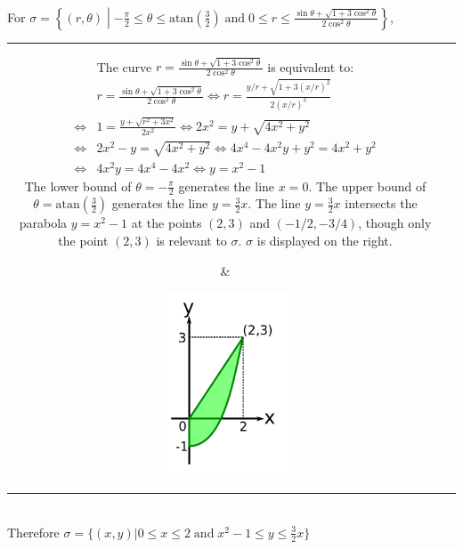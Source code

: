 \documentclass{article}
\newcommand{\atan}{\text{atan}}
\newcommand{\dr}[1]{\textcolor{dark_red}{#1}}
\begin{document}
\dr{\begin{framed}
For \(\sigma = \left\{(r,\theta) \middle| -\frac{\pi}{2} \leq \theta \leq \atan(\frac{3}{2}) \;\text{and}\; 0 \leq r \leq \frac{\sin\theta + \sqrt{1 + 3\cos^2\theta}}{2\cos^2\theta}\right\}\), \\
\begin{tabular}{cc}
\parbox{0.6\textwidth}{
The curve \(r = \frac{\sin\theta + \sqrt{1 + 3\cos^2\theta}}{2\cos^2\theta}\) is equivalent to: 
\begin{align*}
& r = \frac{\sin\theta + \sqrt{1 + 3\cos^2\theta}}{2\cos^2\theta} 
\iff r = \frac{y/r + \sqrt{1 + 3(x/r)^2}}{2(x/r)^2} \\
\iff & 1 = \frac{y + \sqrt{r^2 + 3x^2}}{2x^2} 
\iff 2x^2 = y + \sqrt{4x^2 + y^2} \\
\iff & 2x^2 - y = \sqrt{4x^2 + y^2} 
\iff 4x^4 - 4x^2y + y^2 = 4x^2 + y^2 \\
\iff & 4x^2y = 4x^4 - 4x^2 
\iff y = x^2 - 1
\end{align*}
The lower bound of \(\theta = -\frac{\pi}{2}\) generates the line \(x = 0\). The upper bound of \(\theta = \atan(\frac{3}{2})\) generates the line \(y = \frac{3}{2}x\). The line \(y = \frac{3}{2}x\) intersects the parabola \(y = x^2 - 1\) 
at the points \((2,3)\) and \((-1/2,-3/4)\), though only the point \((2,3)\) is relevant to \(\sigma\). \(\sigma\) is displayed on the right.
} & \parbox{0.4\textwidth}{
\includegraphics[width = 0.3\textwidth]{Test_bench_part_3x_images/Test_bench_part_3x_Solutions_image_11}
}
\end{tabular} \\
Therefore \(\sigma = \{(x,y) | 0 \leq x \leq 2 \;\text{and}\; x^2 - 1 \leq y \leq \frac{3}{2}x\}\)
\end{framed}}
\end{document}
